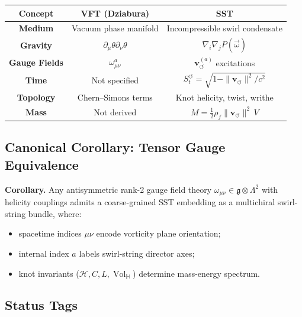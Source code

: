 \documentclass[10pt,reprint,aps,onecolumn,nofootinbib]{revtex4-2}
\newcommand{\Vol}{\operatorname{Vol}}   %
\begin{document}
        \begin{center}
        \renewcommand{\arraystretch}{1.25}
        \begin{tabular}{|c|c|c|}
        \hline
        \textbf{Concept} & \textbf{VFT (Dziabura)} & \textbf{SST} \\
        \hline
        \textbf{Medium} & Vacuum phase manifold & Incompressible swirl condensate \\
        \textbf{Gravity} & $\partial_\mu \theta \partial_\nu \theta$ & $\nabla_i \nabla_j P(\vec{\omega})$ \\
        \textbf{Gauge Fields} & $\omega_{\mu\nu}^{a}$ & $\mathbf{v}_{\!\boldsymbol{\circlearrowleft}}^{(a)}$ excitations \\
        \textbf{Time} & Not specified & $S_t^{\!\boldsymbol{\circlearrowleft}} = \sqrt{1 - \|\mathbf{v}_{\!\boldsymbol{\circlearrowleft}}\|^2 / c^2}$ \\
        \textbf{Topology} & Chern–Simons terms & Knot helicity, twist, writhe \\
        \textbf{Mass} & Not derived & $M = \frac{1}{2} \rho_{\!f} \|\mathbf{v}_{\!\boldsymbol{\circlearrowleft}}\|^2 \, V$ \\
        \hline
        \end{tabular}
        \end{center}

    \subsection*{Canonical Corollary: Tensor Gauge Equivalence}

        \textbf{Corollary.} Any antisymmetric rank-2 gauge field theory $\omega_{\mu\nu} \in \mathfrak{g} \otimes \Lambda^2$ with helicity couplings admits a coarse-grained SST embedding as a multichiral swirl-string bundle, where:
        \begin{itemize}
        \item spacetime indices $\mu\nu$ encode vorticity plane orientation;
        \item internal index $a$ labels swirl-string director axes;
        \item knot invariants ($\mathcal{H}, C, L, \Vol_{\!\mathbb{H}}$) determine mass-energy spectrum.
        \end{itemize}

    \subsection*{Status Tags}
\end{document}
